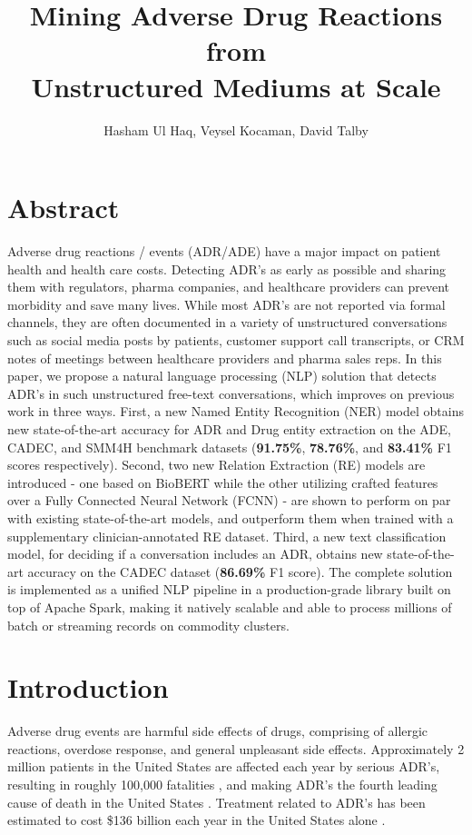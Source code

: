 \documentclass[letterpaper]{article}
\title{Mining Adverse Drug Reactions from \\ Unstructured Mediums at Scale}
\author{
Hasham Ul Haq,
    Veysel Kocaman,
    David Talby
}
\begin{document}
\maketitle

\section{Abstract}
Adverse drug reactions / events (ADR/ADE) have a major impact on patient health and health care costs. Detecting ADR's as early as possible and sharing them with regulators, pharma companies, and healthcare providers can prevent morbidity and save many lives. While most ADR's are not reported via formal channels, they are often documented in a variety of unstructured conversations such as social media posts by patients, customer support call transcripts, or CRM notes of meetings between healthcare providers and pharma sales reps. In this paper, we propose a natural language processing (NLP) solution that detects ADR's in such unstructured free-text conversations, which improves on previous work in three ways. First, a new Named Entity Recognition (NER) model obtains new state-of-the-art accuracy for ADR and Drug entity extraction on the ADE, CADEC, and SMM4H benchmark datasets (\textbf{91.75\%}, \textbf{78.76\%}, and \textbf{83.41\%} F1 scores respectively). Second, two new Relation Extraction (RE) models are introduced - one based on BioBERT while the other utilizing crafted features over a Fully Connected Neural Network (FCNN) - are shown to perform on par with existing state-of-the-art models, and outperform them when trained with a supplementary clinician-annotated RE dataset. Third, a new text classification model, for deciding if a conversation includes an ADR, obtains new state-of-the-art accuracy on the CADEC dataset (\textbf{86.69\%} F1 score). The complete solution is implemented as a unified NLP pipeline in a production-grade library built on top of Apache Spark, making it natively scalable and able to process millions of batch or streaming records on commodity clusters.


\section{Introduction}
Adverse drug events are harmful side effects of drugs, comprising of allergic reactions, overdose response, and general unpleasant side effects. Approximately 2 million patients in the United States are affected each year by serious ADR's, resulting in roughly 100,000 fatalities \cite{leaman2010towards}, and making ADR's the fourth leading cause of death in the United States \cite{giacomini2007good}. Treatment related to ADR's has been estimated to cost \$136 billion each year in the United States alone \cite{van2006adverse}.
\end{document}
